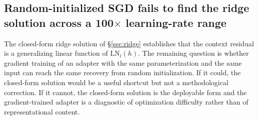 %
%


\newcommand{\abstractsgdsentence}{%
yet SGD-trained low-rank adapters reading the \emph{same} input recover at
most $27\%$ of the residual at the most accessible layer and stay negative
at the deepest, across a $100\times$ learning-rate sweep
($10^{-5}$ to $3{\times}10^{-4}$) covering the standard LoRA default; and
even when initialized from the closed-form ridge solution, AdamW
finetuning at any tested learning rate degrades the solution monotonically,
indicating that the ridge optimum is not a local minimum of the
cross-entropy objective.%
}


\subsection{Random-initialized SGD fails to find the ridge solution across a
100$\times$ learning-rate range}
\label{sec:sgd-random}

The closed-form ridge solution of \S\ref{sec:ridge} establishes that the
context residual is a generalizing linear function of $\mathrm{LN}_l(h)$. The
remaining question is whether gradient training of an adapter with the same
parameterization and the same input can reach the same recovery from random
initialization. If it could, the closed-form solution would be a useful
shortcut but not a methodological correction. If it cannot, the closed-form
solution is the deployable form and the gradient-trained adapter is a
diagnostic of optimization difficulty rather than of representational
content.

